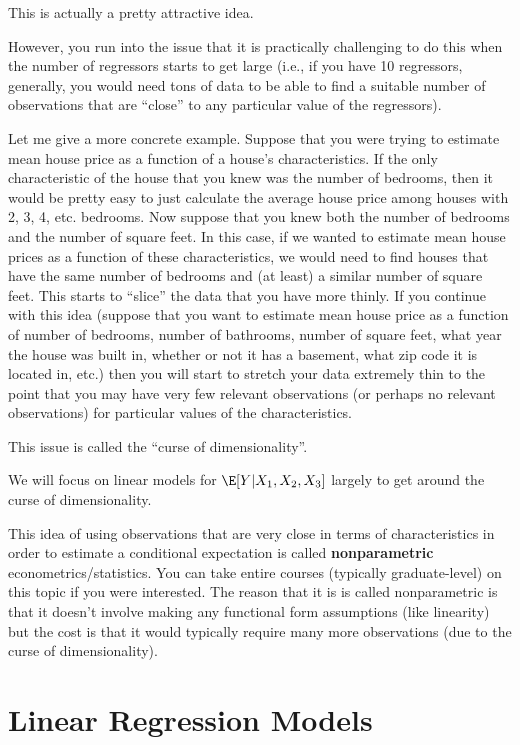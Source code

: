 \documentclass[
  letterpaper,
  DIV=11,
  numbers=noendperiod]{scrreprt}
\begin{document}
This is actually a pretty attractive idea.

However, you run into the issue that it is practically challenging to do
this when the number of regressors starts to get large (i.e., if you
have 10 regressors, generally, you would need tons of data to be able to
find a suitable number of observations that are ``close'' to any
particular value of the regressors).

Let me give a more concrete example. Suppose that you were trying to
estimate mean house price as a function of a house's characteristics. If
the only characteristic of the house that you knew was the number of
bedrooms, then it would be pretty easy to just calculate the average
house price among houses with 2, 3, 4, etc. bedrooms. Now suppose that
you knew both the number of bedrooms and the number of square feet. In
this case, if we wanted to estimate mean house prices as a function of
these characteristics, we would need to find houses that have the same
number of bedrooms and (at least) a similar number of square feet. This
starts to ``slice'' the data that you have more thinly. If you continue
with this idea (suppose that you want to estimate mean house price as a
function of number of bedrooms, number of bathrooms, number of square
feet, what year the house was built in, whether or not it has a
basement, what zip code it is located in, etc.) then you will start to
stretch your data extremely thin to the point that you may have very few
relevant observations (or perhaps no relevant observations) for
particular values of the characteristics.

This issue is called the ``curse of dimensionality''.

We will focus on linear models for \(\E[Y|X_1,X_2,X_3]\) largely to get
around the curse of dimensionality.

This idea of using observations that are very close in terms of
characteristics in order to estimate a conditional expectation is called
\textbf{nonparametric} econometrics/statistics. You can take entire
courses (typically graduate-level) on this topic if you were interested.
The reason that it is is called nonparametric is that it doesn't involve
making any functional form assumptions (like linearity) but the cost is
that it would typically require many more observations (due to the curse
of dimensionality).

\section{Linear Regression Models}\label{linear-regression-models}
\end{document}
